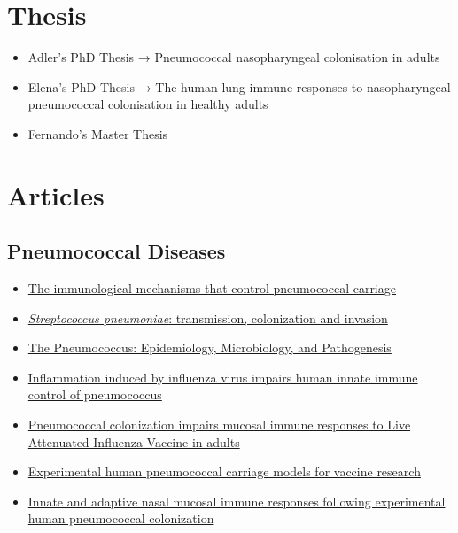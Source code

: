 \documentclass[
]{book}
\begin{document}
\hypertarget{thesis}{%
\section{Thesis}\label{thesis}}

\begin{itemize}
\item
  Adler's PhD Thesis → Pneumococcal nasopharyngeal colonisation in adults
\item
  Elena's PhD Thesis → The human lung immune responses to nasopharyngeal pneumococcal colonisation in healthy adults
\item
  Fernando's Master Thesis
\end{itemize}

\hypertarget{articles}{%
\section{Articles}\label{articles}}

\hypertarget{pneumococcal-diseases}{%
\subsection{Pneumococcal Diseases}\label{pneumococcal-diseases}}

\begin{itemize}
\item
  \href{https://journals.plos.org/plospathogens/article?id=10.1371/journal.ppat.1006665}{The immunological mechanisms that control pneumococcal carriage}
\item
  \href{https://pubmed.ncbi.nlm.nih.gov/29599457/}{\emph{Streptococcus pneumoniae}: transmission, colonization and invasion}
\item
  \href{https://pubmed.ncbi.nlm.nih.gov/23818515/}{The Pneumococcus: Epidemiology, Microbiology, and Pathogenesis}
\item
  \href{https://pubmed.ncbi.nlm.nih.gov/30374129/}{Inflammation induced by influenza virus impairs human innate immune control of pneumococcus}
\item
  \href{https://www.researchgate.net/publication/348794084_Pneumococcal_colonization_impairs_mucosal_immune_responses_to_Live_Attenuated_Influenza_Vaccine_in_adults}{Pneumococcal colonization impairs mucosal immune responses to Live Attenuated Influenza Vaccine in adults}
\item
  \href{}{Experimental human pneumococcal carriage models for vaccine research}
\item
  \href{}{Innate and adaptive nasal mucosal immune responses following experimental human pneumococcal colonization}
\end{itemize}
\end{document}
